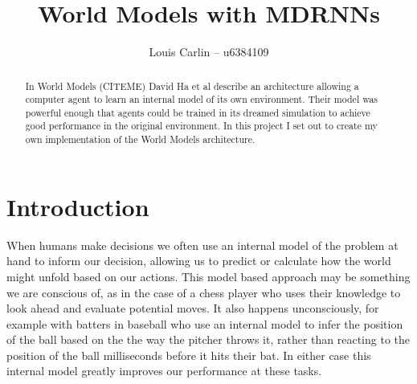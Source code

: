 \documentclass{article}
\author{Louis Carlin -- u6384109}
\title{World Models with MDRNNs}
\numberwithin{figure}{section}
\theoremstyle{definition}
\begin{document}
\maketitle
\begin{abstract}
In World Models (CITEME) David Ha et al describe an architecture allowing a computer agent to learn an internal model of its own environment.
Their model was powerful enough that agents could be trained in its dreamed simulation to achieve good performance in the original environment.
In this project I set out to create my own implementation of the World Models architecture.

\end{abstract}

\section{Introduction}
When humans make decisions we often use an internal model of the problem at hand to inform our decision, allowing us to predict or calculate how the world might unfold based on our actions.
This model based approach may be something we are conscious of, as in the case of a chess player who uses their knowledge to look ahead and evaluate potential moves.
It also happens unconsciously, for example with batters in baseball who use an internal model to infer the position of the ball based on the the way the pitcher throws it, rather than reacting to the position of the ball milliseconds before it hits their bat.
In either case this internal model greatly improves our performance at these tasks.


\end{document}
